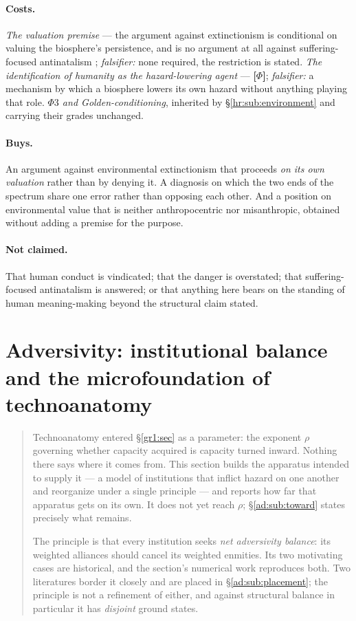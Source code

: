 \documentclass[11pt]{article}
\numberwithin{equation}{section}
\theoremstyle{plain}
\theoremstyle{definition}
\theoremstyle{remark}
\begin{document}
\paragraph{Costs.} \emph{The valuation premise} --- the argument against
extinctionism is conditional on valuing the biosphere's persistence, and
is no argument at all against suffering-focused antinatalism
\cite{Benatar06}; \emph{falsifier:} none required, the restriction is
stated. \emph{The identification of humanity as the hazard-lowering
agent} --- \textbf{[$\Phi$]}; \emph{falsifier:} a mechanism by which a
biosphere lowers its own hazard without anything playing that role.
\emph{$\Phi3$ and Golden-conditioning}, inherited by
\S\ref{hr:sub:environment} and carrying their grades unchanged.

\paragraph{Buys.} An argument against environmental extinctionism that
proceeds \emph{on its own valuation} rather than by denying it. A
diagnosis on which the two ends of the spectrum share one error rather
than opposing each other. And a position on environmental value that is
neither anthropocentric nor misanthropic, obtained without adding a
premise for the purpose.

\paragraph{Not claimed.} That human conduct is vindicated; that the
danger is overstated; that suffering-focused antinatalism is answered;
or that anything here bears on the standing of human meaning-making
beyond the structural claim stated.


\section[Adversivity and the microfoundation of technoanatomy]{Adversivity:
institutional balance and the microfoundation of technoanatomy}\label{ad:sec}

\begin{quote}\small
Technoanatomy entered \S\ref{gr1:sec} as a parameter: the exponent
$\rho$ governing whether capacity acquired is capacity turned inward.
Nothing there says where it comes from. This section builds the
apparatus intended to supply it --- a model of institutions that
inflict hazard on one another and reorganize under a single principle
--- and reports how far that apparatus gets on its own. It does not yet
reach $\rho$; \S\ref{ad:sub:toward} states precisely what remains.

The principle is that every institution seeks \emph{net adversivity
balance}: its weighted alliances should cancel its weighted enmities.
Its two motivating cases are historical, and the section's numerical
work reproduces both. Two literatures border it closely and are placed
in \S\ref{ad:sub:placement}; the principle is not a refinement of
either, and against structural balance in particular it has
\emph{disjoint} ground states.
\end{quote}
\end{document}
